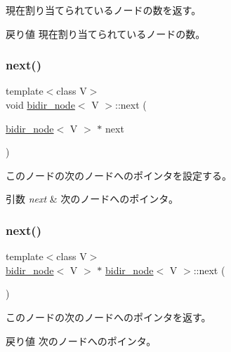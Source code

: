 現在割り当てられているノードの数を返す。 \begin{DoxyReturn}{戻り値}
現在割り当てられているノードの数。 
\end{DoxyReturn}
\hypertarget{classbidir__node_a2e0451434557bab73a6950037073267a}{}\label{classbidir__node_a2e0451434557bab73a6950037073267a} 
\subsubsection{\texorpdfstring{next()}{next()}\hspace{0.1cm}{\footnotesize\ttfamily [1/2]}}
{\footnotesize\ttfamily template$<$class V$>$ \\
void \hyperlink{classbidir__node}{bidir\+\_\+node}$<$ V $>$\+::next (\begin{DoxyParamCaption}\item[{\hyperlink{classbidir__node}{bidir\+\_\+node}$<$ V $>$ $\ast$}]{next }\end{DoxyParamCaption})}

このノードの次のノードへのポインタを設定する。 
\begin{DoxyParams}{引数}
{\em next} & 次のノードへのポインタ。 \\
\hline
\end{DoxyParams}
\hypertarget{classbidir__node_af76a5d53aff4b6f71361fa7477d0c758}{}\label{classbidir__node_af76a5d53aff4b6f71361fa7477d0c758} 
\subsubsection{\texorpdfstring{next()}{next()}\hspace{0.1cm}{\footnotesize\ttfamily [2/2]}}
{\footnotesize\ttfamily template$<$class V$>$ \\
\hyperlink{classbidir__node}{bidir\+\_\+node}$<$ V $>$ $\ast$ \hyperlink{classbidir__node}{bidir\+\_\+node}$<$ V $>$\+::next (\begin{DoxyParamCaption}{ }\end{DoxyParamCaption})}

このノードの次のノードへのポインタを返す。 \begin{DoxyReturn}{戻り値}
次のノードへのポインタ。 
\end{DoxyReturn}
\hypertarget{classbidir__node_a50277ce12bf4fccf682ad0a7d70b4e0b}{}\label{classbidir__node_a50277ce12bf4fccf682ad0a7d70b4e0b} 
